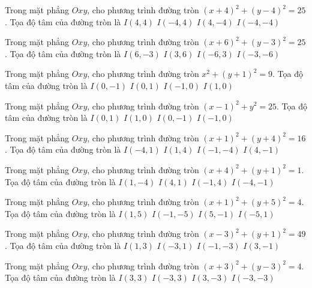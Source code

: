 \begin{ex}
Trong mặt phẳng $Oxy$, cho phương trình đường tròn $(x + 4)^2  + (y -4)^2 = 25$. Tọa độ tâm của đường tròn là
\choice
{ $I(4, 4)$ }
{ \True $I(-4, 4)$ }
{ $I(4, -4)$ }
{ $I(-4, -4)$ }
\end{ex}

\begin{ex}
Trong mặt phẳng $Oxy$, cho phương trình đường tròn $(x + 6)^2  + (y -3)^2 = 25$. Tọa độ tâm của đường tròn là
\choice
{ $I(6, -3)$ }
{ $I(3, 6)$ }
{ \True $I(-6, 3)$ }
{ $I(-3, -6)$ }
\end{ex}

\begin{ex}
Trong mặt phẳng $Oxy$, cho phương trình đường tròn $x^2 + (y + 1)^2 = 9$. Tọa độ tâm của đường tròn là
\choice
{ \True $I(0, -1)$ }
{ $I(0, 1)$ }
{ $I(-1, 0)$ }
{ $I(1, 0)$ }
\end{ex}

\begin{ex}
Trong mặt phẳng $Oxy$, cho phương trình đường tròn $(x -1)^2   + y^2 = 25$. Tọa độ tâm của đường tròn là
\choice
{ $I(0, 1)$ }
{ \True $I(1, 0)$ }
{ $I(0, -1)$ }
{ $I(-1, 0)$ }
\end{ex}

\begin{ex}
Trong mặt phẳng $Oxy$, cho phương trình đường tròn $(x + 1)^2  + (y + 4)^2 = 16$. Tọa độ tâm của đường tròn là
\choice
{ $I(-4, 1)$ }
{ $I(1, 4)$ }
{ \True $I(-1, -4)$ }
{ $I(4, -1)$ }
\end{ex}

\begin{ex}
Trong mặt phẳng $Oxy$, cho phương trình đường tròn $(x + 4)^2  + (y + 1)^2 = 1$. Tọa độ tâm của đường tròn là
\choice
{ $I(1, -4)$ }
{ $I(4, 1)$ }
{ $I(-1, 4)$ }
{ \True $I(-4, -1)$ }
\end{ex}

\begin{ex}
Trong mặt phẳng $Oxy$, cho phương trình đường tròn $(x + 1)^2  + (y + 5)^2 = 4$. Tọa độ tâm của đường tròn là
\choice
{ $I(1, 5)$ }
{ \True $I(-1, -5)$ }
{ $I(5, -1)$ }
{ $I(-5, 1)$ }
\end{ex}

\begin{ex}
Trong mặt phẳng $Oxy$, cho phương trình đường tròn $(x -3)^2   + (y + 1)^2 = 49$. Tọa độ tâm của đường tròn là
\choice
{ $I(1, 3)$ }
{ $I(-3, 1)$ }
{ $I(-1, -3)$ }
{ \True $I(3, -1)$ }
\end{ex}

\begin{ex}
Trong mặt phẳng $Oxy$, cho phương trình đường tròn $(x + 3)^2  + (y -3)^2 = 4$. Tọa độ tâm của đường tròn là
\choice
{ $I(3, 3)$ }
{ \True $I(-3, 3)$ }
{ $I(3, -3)$ }
{ $I(-3, -3)$ }
\end{ex}

